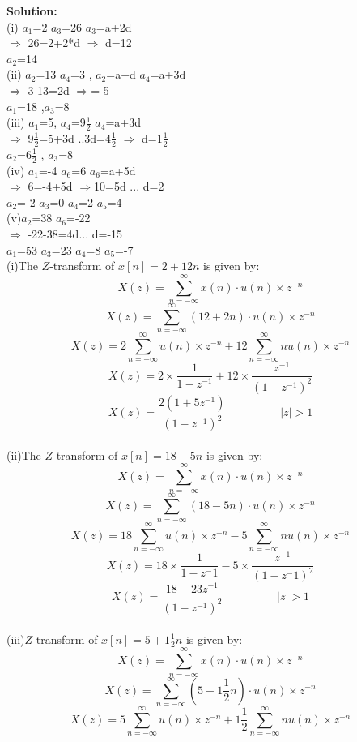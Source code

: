 \documentclass[journal,12pt,twocolumn]{IEEEtran}
\theoremstyle{remark}
\begin{document}
\textbf{Solution:}\\

(i) $a_1$=2 $a_3$=26 $a_3$=a+2d\\
$\Longrightarrow$ 26=2+2*d $\Longrightarrow$ d=12\\
$a_2$=14\\
(ii) $a_2$=13 $a_4$=3 , $a_2$=a+d $a_4$=a+3d \\
$\Longrightarrow$ 3-13=2d $\Longrightarrow$=-5\\ $a_1$=18 ,$a_3$=8\\
(iii) $a_1$=5, $a_4$=9\(\frac{1}{2}\) $a_4$=a+3d\\
$\Longrightarrow$ 9\(\frac{1}{2}\)=5+3d ..3d=4\(\frac{1}{2}\) $\Longrightarrow$ d=1\(\frac{1}{2}\)\\
$a_2$=6\(\frac{1}{2}\) , $a_3$=8\\
(iv) $a_1$=-4 $a_6$=6 $a_6$=a+5d\\
$\Longrightarrow$ 6=-4+5d $\Longrightarrow$10=5d ... d=2\\
$a_2$=-2 $a_3$=0 $a_4$=2 $a_5$=4\\
(v)$a_2$=38 $a_6$=-22 \\
$\Longrightarrow$ -22-38=4d... d=-15\\
$a_1$=53 $a_3$=23 $a_4$=8 $a_5$=-7\\
(i)The $Z$-transform of $x[n] = 2 + 12n$ is given by:
\[X(z)= \sum_{n=-\infty}^{\infty} x(n)\cdot u(n) \times z^{-n}\]
\[ X(z) = \sum_{n=-\infty}^{\infty} (12+2n)\cdot u(n) \times z^{-n} \]
\[X(z)=2 \sum_{n=-\infty}^{\infty}u(n)\times z^{-n}+12 \sum_{n=-\infty}^{\infty}nu(n)\times z^{-n}\]
\[X(z)=2 \times \frac{1}{1-{z^{-1}}}+ 12 \times \frac{z^{-1}}{(1-{z^{-1}})^2}\]
\[X(z)=\frac{2(1+{5z^{-1}})}{(1-{z^{-1}})^2}  \hspace{2cm}  |z|>1 \]\\
(ii)The $Z$-transform of $x[n] = 18 - 5n$ is given by:
\[ X(z) = \sum_{n=-\infty}^{\infty} x(n)\cdot u(n)\times z^{-n} \]
\[ X(z) = \sum_{n=-\infty}^{\infty} (18-5n)\cdot u(n) \times z^{-n} \]
\[X(z)=18 \sum_{n=-\infty}^{\infty}u(n)\times z^{-n} - 5\sum_{n=-\infty}^{\infty} nu(n)\times z^{-n}\]
\[X(z)=18 \times \frac{1}{1-{z^-1}} - 5 \times \frac{z^{-1}}{(1-{z^-1})^2}\]
\[X(z)=\frac{18-{23z^{-1}}}{(1-{z^{-1}})^2}  \hspace{2cm}  |z|>1 \]\\
(iii)$Z$-transform of $x[n] = 5 + 1\frac{1}{2}n$ is given by:
\[ X(z) = \sum_{n=-\infty}^{\infty} x(n)\cdot u(n)\times z^{-n} \]
\[ X(z) = \sum_{n=-\infty}^{\infty} (5+1\frac{1}{2}n) \cdot u(n) \times z^{-n} \]
\[X(z)=5 \sum_{n=-\infty}^{\infty}u(n)\times z^{-n}+1\frac{1}{2} \sum_{n=-\infty}^{\infty} nu(n) \times z^{-n}\]
\end{document}

